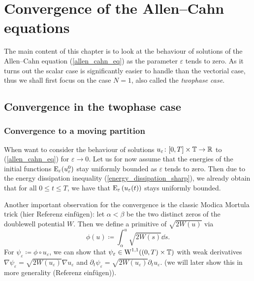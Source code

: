 \chapter{Convergence of the Allen--Cahn equations}

The main content of this chapter is to look at the behaviour of solutions of the Allen--Cahn equation (\ref{allen_cahn_eq}) as the parameter $ \varepsilon $ tends to zero. As it turns out the scalar case is significantly easier to handle than the vectorial case, thus we shall first focus on the case $ N = 1 $,
also called the \emph{twophase case}.

\section{Convergence in the twophase case}

\subsection{Convergence to a moving partition}

When want to consider the behaviour of solutions $ u_{ \varepsilon} \colon [0, T] \times \operatorname{\mathbb{T}} \to \mathbb{ R } $ to (\ref{allen_cahn_eq}) for $ \varepsilon \to 0 $. Let us for now assume that the energies of the initial functions $ \operatorname{E}_{ \varepsilon } ( u_{ \varepsilon }^{ 0 } ) $ stay uniformly bounded as $ \varepsilon $ tends to zero. 
Then due to the energy dissipation inequality (\ref{energy_dissipation_sharp}), we already obtain that for all
$ 0 \leq t \leq T $, we have that $ \operatorname{E}_{ \varepsilon } \left( u_{\varepsilon } ( t ) \right) $ stays uniformly  bounded.

Another important observation for the convergence is the classic Modica Mortula trick (hier Referenz einfügen): let $ \alpha < \beta $ be the two distinct zeros of the doublewell potential $ W $.
Then we define a primitive of $ \sqrt{ 2 W ( u ) } $ via
\begin{equation*}
	\phi ( u ) 
	\coloneqq
	\int_{ \alpha }^{ u }
		\sqrt{ 2 W ( s ) }
	\dd{ s }.
\end{equation*}
For $ \psi_{ \varepsilon } \coloneqq \phi \circ u_{ \varepsilon } $, we can show that $ \psi_{ \varepsilon } \in \operatorname{W}^{ 1, 1 } ( ( 0 , T ) \times \operatorname{\mathbb{T}} ) $ with weak derivatives $ \nabla \psi_{ \varepsilon } = \sqrt{ 2 W ( u_{ \varepsilon } ) } \nabla u_{ \varepsilon } $ and $ \partial_{ t } \psi_{ \varepsilon } = \sqrt{ 2 W ( u_{ \varepsilon } ) } \partial_{ t } u_{ \varepsilon } $. (we will later show this in more generality (Referenz einfügen)).

